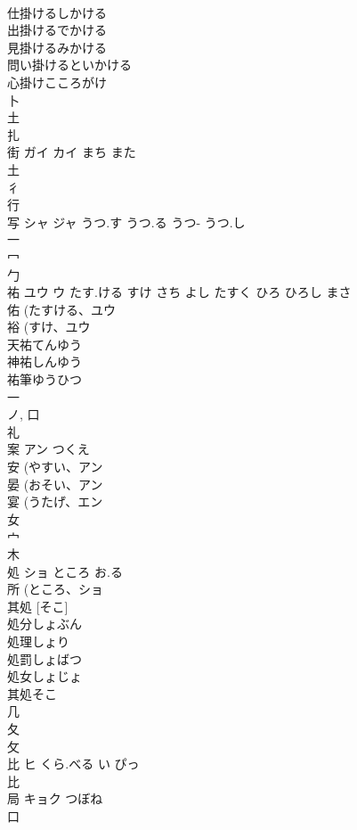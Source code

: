 \documentclass[8pt]{extreport}
\begin{document}
\begin{CJK}{UTF8}{min}
\\	仕掛けるしかける
\\	出掛けるでかける
\\	見掛けるみかける
\\	問い掛けるといかける
\\	心掛けこころがけ
\\	卜 
\\	土 
\\	扎	
\\	街	ガイ カイ	まち また	
\\	土 
\\	彳 
\\	行 
\\	写	シャ ジャ	うつ.す うつ.る うつ- うつ.し	
\\	一 
\\	冖 
\\	勹 
\\	祐	ユウ ウ	たす.ける すけ さち よし たすく ひろ ひろし まさ	
\\	佑 (たすける、ユウ 
\\	裕 (すけ、ユウ 
\\	天祐てんゆう 
\\	神祐しんゆう 
\\	祐筆ゆうひつ 
\\	一 
\\	ノ, 口 
\\	礼 
\\	案	アン	つくえ	
\\	安 (やすい、アン 
\\	晏 (おそい、アン 
\\	宴 (うたげ、エン 
\\	女 
\\	宀 
\\	木 
\\	処	ショ	ところ お.る	
\\	所 (ところ、ショ 
\\	其処 [そこ] 
\\	処分しょぶん
\\	処理しょり
\\	処罰しょばつ
\\	処女しょじょ
\\	其処そこ
\\	几 
\\	夂 
\\	攵 
\\	比	ヒ	くら.べる い ぴっ	
\\	比 
\\	局	キョク	つぼね	
\\	口 

\end{CJK}
\end{document}
